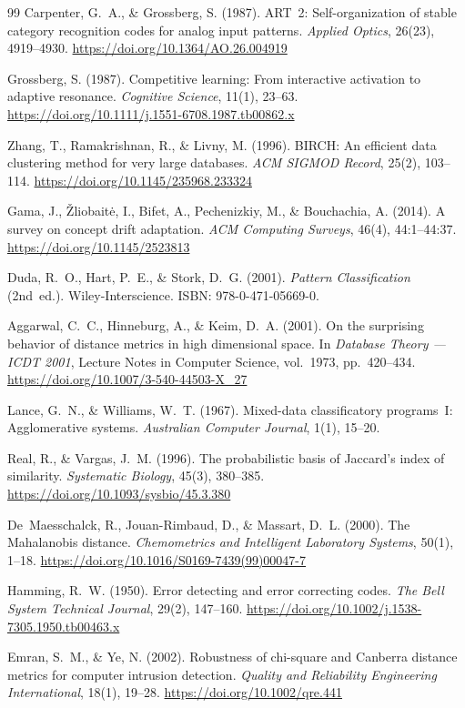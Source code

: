 \documentclass[12pt,a4paper]{article}
\theoremstyle{definition}
\theoremstyle{plain}
\theoremstyle{remark}
\begin{document}
\begin{thebibliography}{99}
Carpenter, G.~A., \& Grossberg, S. (1987).
ART~2: Self-organization of stable category recognition codes for analog input patterns.
\emph{Applied Optics}, 26(23), 4919--4930.
\url{https://doi.org/10.1364/AO.26.004919}

Grossberg, S. (1987).
Competitive learning: From interactive activation to adaptive resonance.
\emph{Cognitive Science}, 11(1), 23--63.
\url{https://doi.org/10.1111/j.1551-6708.1987.tb00862.x}

Zhang, T., Ramakrishnan, R., \& Livny, M. (1996).
BIRCH: An efficient data clustering method for very large databases.
\emph{ACM SIGMOD Record}, 25(2), 103--114.
\url{https://doi.org/10.1145/235968.233324}

Gama, J., \v{Z}liobait\.{e}, I., Bifet, A., Pechenizkiy, M., \& Bouchachia, A. (2014).
A survey on concept drift adaptation.
\emph{ACM Computing Surveys}, 46(4), 44:1--44:37.
\url{https://doi.org/10.1145/2523813}

Duda, R.~O., Hart, P.~E., \& Stork, D.~G. (2001).
\emph{Pattern Classification} (2nd~ed.).
Wiley-Interscience.
ISBN: 978-0-471-05669-0.

Aggarwal, C.~C., Hinneburg, A., \& Keim, D.~A. (2001).
On the surprising behavior of distance metrics in high dimensional space.
In \emph{Database Theory --- ICDT 2001}, Lecture Notes in Computer Science, vol.~1973, pp.~420--434.
\url{https://doi.org/10.1007/3-540-44503-X\_27}

Lance, G.~N., \& Williams, W.~T. (1967).
Mixed-data classificatory programs~I: Agglomerative systems.
\emph{Australian Computer Journal}, 1(1), 15--20.

Real, R., \& Vargas, J.~M. (1996).
The probabilistic basis of Jaccard's index of similarity.
\emph{Systematic Biology}, 45(3), 380--385.
\url{https://doi.org/10.1093/sysbio/45.3.380}

De~Maesschalck, R., Jouan-Rimbaud, D., \& Massart, D.~L. (2000).
The Mahalanobis distance.
\emph{Chemometrics and Intelligent Laboratory Systems}, 50(1), 1--18.
\url{https://doi.org/10.1016/S0169-7439(99)00047-7}

Hamming, R.~W. (1950).
Error detecting and error correcting codes.
\emph{The Bell System Technical Journal}, 29(2), 147--160.
\url{https://doi.org/10.1002/j.1538-7305.1950.tb00463.x}

Emran, S.~M., \& Ye, N. (2002).
Robustness of chi-square and Canberra distance metrics for computer intrusion detection.
\emph{Quality and Reliability Engineering International}, 18(1), 19--28.
\url{https://doi.org/10.1002/qre.441}

\end{thebibliography}
\end{document}
